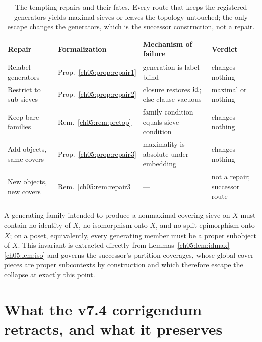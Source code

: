 \begin{table}[ht]
\centering
{\small
\begin{tabular}{@{}>{\raggedright\arraybackslash}p{}
>{\raggedright\arraybackslash}p{}
>{\raggedright\arraybackslash}p{}
>{\raggedright\arraybackslash}p{}@{}}
\toprule
Repair & Formalization & Mechanism of failure & Verdict \\
\midrule
Relabel generators & Prop.~\ref{ch05:prop:repair1} & generation is
label-blind & changes nothing \\
Restrict to sub-sieves & Prop.~\ref{ch05:prop:repair2} & closure restores
$\mathrm{id}$; else clause vacuous & maximal or nothing \\
Keep bare families & Rem.~\ref{ch05:rem:pretop} & family condition equals
sieve condition & changes nothing \\
Add objects, same covers & Prop.~\ref{ch05:prop:repair3} & maximality is
absolute under embedding & changes nothing \\
New objects, new covers & Rem.~\ref{ch05:rem:repair3} & --- & not a repair;
successor route \\
\bottomrule
\end{tabular}}
\caption{The tempting repairs and their fates. Every route that keeps the
registered generators yields maximal sieves or leaves the topology
untouched; the only escape changes the generators, which is the successor
construction, not a repair.}
\label{ch05:tab:repairs}
\end{table}

\begin{invariant}
\label{ch05:inv:designrule}
A generating family intended to produce a nonmaximal covering sieve on $X$
must contain no identity of $X$, no isomorphism onto $X$, and no split
epimorphism onto $X$; on a poset, equivalently, every generating member must
be a proper subobject of $X$. This invariant is extracted directly from
Lemmas~\ref{ch05:lem:idmax}--\ref{ch05:lem:iso} and governs the successor's
partition coverages, whose global cover pieces are proper subcontexts by
construction and which therefore escape the collapse at exactly this point.
\end{invariant}

\section{What the v7.4 corrigendum retracts, and what it preserves}
\label{ch05:sec:corrigendum}

